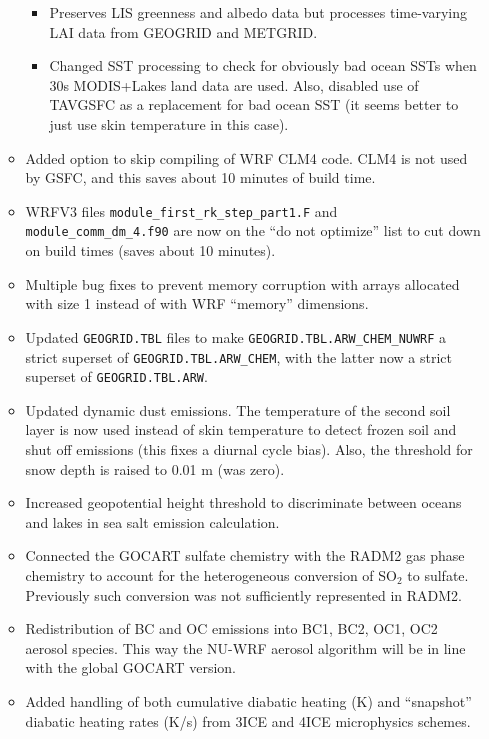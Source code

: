 \begin{itemize}
\begin{itemize}
    \begin{itemize}
    \item Preserves LIS greenness and albedo data but processes time-varying 
      LAI data from GEOGRID and METGRID.
    \item Changed SST processing to check for obviously bad ocean SSTs when
      30s MODIS+Lakes land data are used. Also, disabled use of TAVGSFC as
      a replacement for bad ocean SST (it seems better to just use skin 
      temperature in this case).
    \end{itemize}
  \item Added option to skip compiling of WRF CLM4 code.  CLM4 is not used by
    GSFC, and this saves about 10 minutes of build time.
  \item WRFV3 files \texttt{module\_first\_rk\_step\_part1.F} and 
    \texttt{module\_comm\_dm\_4.f90} are now on the ``do not optimize'' list 
    to cut down on build times (saves about 10 minutes).
  \item Multiple bug fixes to prevent memory corruption with arrays allocated
    with size 1 instead of with WRF ``memory'' dimensions.
  \item Updated \texttt{GEOGRID.TBL} files to make 
    \texttt{GEOGRID.TBL.ARW\_CHEM\_NUWRF} a strict superset of 
    \texttt{GEOGRID.TBL.ARW\_CHEM}, with the latter now a strict superset
    of \texttt{GEOGRID.TBL.ARW}.
  \item Updated dynamic dust emissions. The temperature of the second soil 
    layer is now used instead of skin temperature to detect frozen soil and 
    shut off emissions (this fixes a diurnal cycle bias).  Also, the threshold
    for snow depth is raised to 0.01 m (was zero).
  \item Increased geopotential height threshold to discriminate between oceans
    and lakes in sea salt emission calculation.
  \item Connected the GOCART sulfate chemistry with the RADM2 gas phase
    chemistry to account for the heterogeneous conversion of SO$_2$ to sulfate.
    Previously such conversion was not sufficiently represented in RADM2.
  \item Redistribution of BC and OC emissions into BC1, BC2, OC1, OC2 aerosol 
    species.  This way the NU-WRF aerosol algorithm will be in line with the 
    global GOCART version.
  \item Added handling of both cumulative diabatic heating (K) and ``snapshot''
    diabatic heating rates (K/s) from 3ICE and 4ICE microphysics schemes.

\end{itemize}
\end{itemize}
